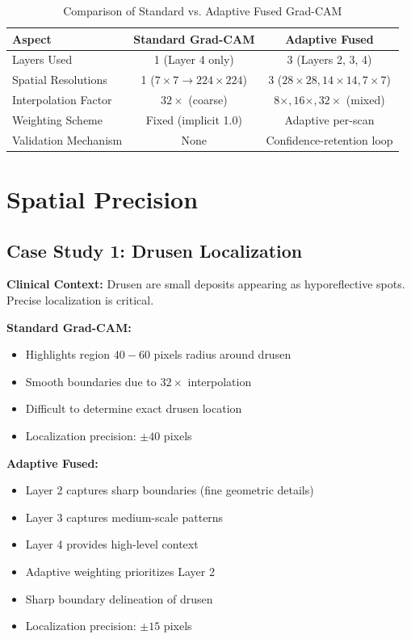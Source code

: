 \documentclass[12pt,a4paper,oneside]{book}
\begin{document}
\begin{table}[H]
\centering
\begin{tabular}{lcc}
\toprule
\textbf{Aspect} & \textbf{Standard Grad-CAM} & \textbf{Adaptive Fused} \\
\midrule
Layers Used & 1 (Layer 4 only) & 3 (Layers 2, 3, 4) \\
Spatial Resolutions & 1 ($7 \times 7 \to 224 \times 224$) & 3 ($28 \times 28, 14 \times 14, 7 \times 7$) \\
Interpolation Factor & $32 \times$ (coarse) & $8 \times, 16 \times, 32 \times$ (mixed) \\
Weighting Scheme & Fixed (implicit 1.0) & Adaptive per-scan \\
Validation Mechanism & None & Confidence-retention loop \\
\bottomrule
\end{tabular}
\caption{Comparison of Standard vs. Adaptive Fused Grad-CAM}
\label{tab:comparison}
\end{table}

\section{Spatial Precision}

\subsection{Case Study 1: Drusen Localization}

\textbf{Clinical Context:} Drusen are small deposits appearing as hyporeflective spots. Precise localization is critical.

\textbf{Standard Grad-CAM:}
\begin{itemize}
  \item Highlights region $40-60$ pixels radius around drusen
  \item Smooth boundaries due to $32 \times$ interpolation
  \item Difficult to determine exact drusen location
  \item Localization precision: $\pm 40$ pixels
\end{itemize}

\textbf{Adaptive Fused:}
\begin{itemize}
  \item Layer 2 captures sharp boundaries (fine geometric details)
  \item Layer 3 captures medium-scale patterns
  \item Layer 4 provides high-level context
  \item Adaptive weighting prioritizes Layer 2
  \item Sharp boundary delineation of drusen
  \item Localization precision: $\pm 15$ pixels
\end{itemize}
\end{document}
